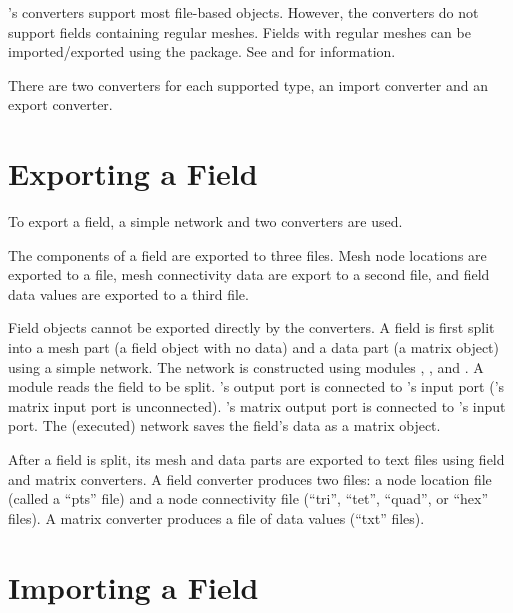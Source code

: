 
\sr{}'s converters support most \sr{} file-based objects.  However,
the converters do not support fields containing regular meshes.
Fields with regular meshes can be imported/exported using the
 package.  See  and
for information.

There are two converters for each supported \sr{} type, an import
converter and an export converter.

\section{Exporting a Field}
\label{sec:export_field}

To export a field, a simple \sci{} network and two converters are used.

The components of a field are exported to three files.  Mesh node
locations are exported to a file, mesh connectivity data are export to
a second file, and field data values are exported to a third file.

Field objects cannot be exported directly by the converters.  A field
is first split into a mesh part (a field object with no data) and a
data part (a matrix object) using a simple \sr{} network.  The
network is constructed using modules ,
, and .  A
 module reads the field to be split.
's output port is connected to
's input port ('s
matrix input port is unconnected).  's
matrix output port is connected to 's input
port.  The (executed) network saves the field's data as a matrix object.

After a field is split, its mesh and data parts are exported to
text files using field and matrix converters.  A field converter
produces two files: a node location file (called a ``pts'' file) and a
node connectivity file (``tri'', ``tet'', ``quad'', or ``hex'' files).
A matrix converter produces a file of data values (``txt'' files).

\section{Importing a Field}
\label{sec:import_field}

